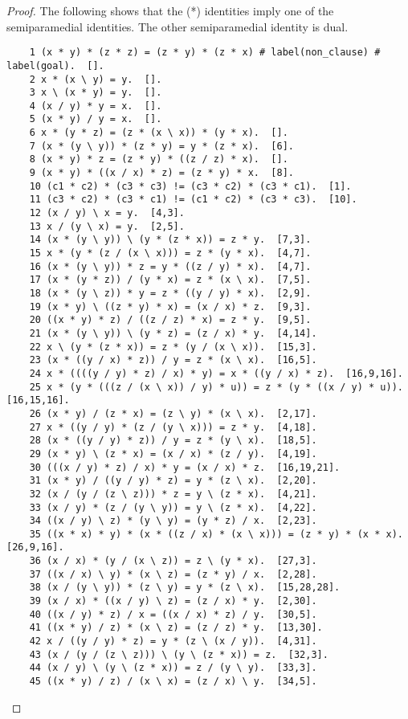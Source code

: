 \documentclass[12pt]{report}
\theoremstyle{definition}
\begin{document}
\begin{proof}
  The following shows that the (*) identities imply one of the semiparamedial identities. The other semiparamedial identity is dual.
	\begin{lstlisting}
    1 (x * y) * (z * z) = (z * y) * (z * x) # label(non_clause) # label(goal).  [].
    2 x * (x \ y) = y.  [].
    3 x \ (x * y) = y.  [].
    4 (x / y) * y = x.  [].
    5 (x * y) / y = x.  [].
    6 x * (y * z) = (z * (x \ x)) * (y * x).  [].
    7 (x * (y \ y)) * (z * y) = y * (z * x).  [6].
    8 (x * y) * z = (z * y) * ((z / z) * x).  [].
    9 (x * y) * ((x / x) * z) = (z * y) * x.  [8].
    10 (c1 * c2) * (c3 * c3) != (c3 * c2) * (c3 * c1).  [1].
    11 (c3 * c2) * (c3 * c1) != (c1 * c2) * (c3 * c3).  [10].
    12 (x / y) \ x = y.  [4,3].
    13 x / (y \ x) = y.  [2,5].
    14 (x * (y \ y)) \ (y * (z * x)) = z * y.  [7,3].
    15 x * (y * (z / (x \ x))) = z * (y * x).  [4,7].
    16 (x * (y \ y)) * z = y * ((z / y) * x).  [4,7].
    17 (x * (y * z)) / (y * x) = z * (x \ x).  [7,5].
    18 (x * (y \ z)) * y = z * ((y / y) * x).  [2,9].
    19 (x * y) \ ((z * y) * x) = (x / x) * z.  [9,3].
    20 ((x * y) * z) / ((z / z) * x) = z * y.  [9,5].
    21 (x * (y \ y)) \ (y * z) = (z / x) * y.  [4,14].
    22 x \ (y * (z * x)) = z * (y / (x \ x)).  [15,3].
    23 (x * ((y / x) * z)) / y = z * (x \ x).  [16,5].
    24 x * ((((y / y) * z) / x) * y) = x * ((y / x) * z).  [16,9,16].
    25 x * (y * (((z / (x \ x)) / y) * u)) = z * (y * ((x / y) * u)).  [16,15,16].
    26 (x * y) / (z * x) = (z \ y) * (x \ x).  [2,17].
    27 x * ((y / y) * (z / (y \ x))) = z * y.  [4,18].
    28 (x * ((y / y) * z)) / y = z * (y \ x).  [18,5].
    29 (x * y) \ (z * x) = (x / x) * (z / y).  [4,19].
    30 (((x / y) * z) / x) * y = (x / x) * z.  [16,19,21].
    31 (x * y) / ((y / y) * z) = y * (z \ x).  [2,20].
    32 (x / (y / (z \ z))) * z = y \ (z * x).  [4,21].
    33 (x / y) * (z / (y \ y)) = y \ (z * x).  [4,22].
    34 ((x / y) \ z) * (y \ y) = (y * z) / x.  [2,23].
    35 ((x * x) * y) * (x * ((z / x) * (x \ x))) = (z * y) * (x * x).  [26,9,16].
    36 (x / x) * (y / (x \ z)) = z \ (y * x).  [27,3].
    37 ((x / x) \ y) * (x \ z) = (z * y) / x.  [2,28].
    38 (x / (y \ y)) * (z \ y) = y * (z \ x).  [15,28,28].
    39 (x / x) * ((x / y) \ z) = (z / x) * y.  [2,30].
    40 ((x / y) * z) / x = ((x / x) * z) / y.  [30,5].
    41 ((x * y) / z) * (x \ z) = (z / z) * y.  [13,30].
    42 x / ((y / y) * z) = y * (z \ (x / y)).  [4,31].
    43 (x / (y / (z \ z))) \ (y \ (z * x)) = z.  [32,3].
    44 (x / y) \ (y \ (z * x)) = z / (y \ y).  [33,3].
    45 ((x * y) / z) / (x \ x) = (z / x) \ y.  [34,5].

\end{lstlisting}
\end{proof}
\end{document}
